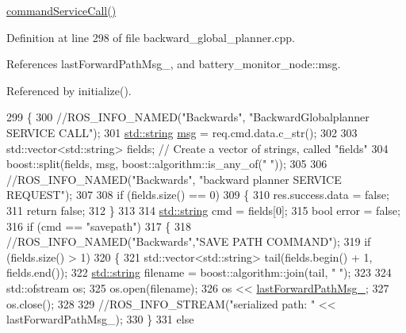 \hyperlink{classcl__move__base__z_1_1backward__global__planner_1_1BackwardGlobalPlanner_a399a3dd0a3f8c781be06158e3238a5d9}{command\+Service\+Call()} 

Definition at line 298 of file backward\+\_\+global\+\_\+planner.\+cpp.



References last\+Forward\+Path\+Msg\+\_\+, and battery\+\_\+monitor\+\_\+node\+::msg.



Referenced by initialize().


\begin{DoxyCode}
299 \{
300     \textcolor{comment}{//ROS\_INFO\_NAMED("Backwards", "BackwardGlobalplanner SERVICE CALL");}
301     \hyperlink{namespacetesting_1_1internal_a8e8ff5b11e64078831112677156cb111}{std::string} \hyperlink{namespacebattery__monitor__node_ab1920c64448816edd4064e494275fdff}{msg} = req.cmd.data.c\_str();
302 
303     std::vector<std::string> fields; \textcolor{comment}{// Create a vector of strings, called "fields"}
304     boost::split(fields, msg, boost::algorithm::is\_any\_of(\textcolor{stringliteral}{" "}));
305 
306     \textcolor{comment}{//ROS\_INFO\_NAMED("Backwards", "backward planner SERVICE REQUEST");}
307 
308     \textcolor{keywordflow}{if} (fields.size() == 0)
309     \{
310         res.success.data = \textcolor{keyword}{false};
311         \textcolor{keywordflow}{return} \textcolor{keyword}{false};
312     \}
313 
314     \hyperlink{namespacetesting_1_1internal_a8e8ff5b11e64078831112677156cb111}{std::string} cmd = fields[0];
315     \textcolor{keywordtype}{bool} error = \textcolor{keyword}{false};
316     \textcolor{keywordflow}{if} (cmd == \textcolor{stringliteral}{"savepath"})
317     \{
318         \textcolor{comment}{//ROS\_INFO\_NAMED("Backwards","SAVE PATH COMMAND");}
319         \textcolor{keywordflow}{if} (fields.size() > 1)
320         \{
321             std::vector<std::string> tail(fields.begin() + 1, fields.end());
322             \hyperlink{namespacetesting_1_1internal_a8e8ff5b11e64078831112677156cb111}{std::string} filename = boost::algorithm::join(tail, \textcolor{stringliteral}{" "});
323 
324             std::ofstream os;
325             os.open(filename);
326             os << \hyperlink{classcl__move__base__z_1_1backward__global__planner_1_1BackwardGlobalPlanner_a149ee7d22d98271c9ee1da55241d500b}{lastForwardPathMsg\_};
327             os.close();
328 
329             \textcolor{comment}{//ROS\_INFO\_STREAM("serialized path: " << lastForwardPathMsg\_);}
330         \}
331         \textcolor{keywordflow}{else}

\end{DoxyCode}
